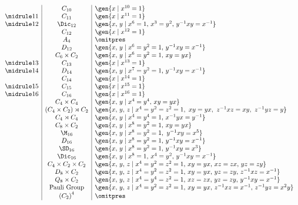 \begin{table}
\begin{center}
\begin{displaymath}
\begin{array}{c|c|l}
       & C_{10} & \gen{x \mid x^{10} = 1} \\
    \midrule
    11 & C_{11} & \gen{x \mid x^{11} = 1} \\
    \midrule
    12 & \Dic_{12} & \gen{x,\,y \mid x^6 = 1,\, x^3 = y^2,\, y^{-1}xy = x^{-1}} \\
       & C_{12} & \gen{x \mid x^{12} = 1} \\
       & A_4 & {\omitpres} \\ %
       & D_{12} & \gen{x,\,y \mid x^6 = y^2 = 1,\, y^{-1}xy = x^{-1}} \\
       & C_6 \times C_2 & \gen{x,\,y \mid x^6 = y^2 = 1,\, xy = yx} \\
    \midrule
    13 & C_{13} & \gen{x \mid x^{13} = 1} \\
    \midrule
    14 & D_{14} & \gen{x,\,y \mid x^7 = y^2 = 1,\, y^{-1}xy = x^{-1}} \\
       & C_{14} & \gen{x \mid x^{14} = 1} \\
    \midrule
    15 & C_{15} & \gen{x \mid x^{15} = 1} \\
    \midrule
    16 & C_{16} & \gen{x \mid x^{16} = 1} \\
       & C_4 \times C_4 & \gen{x,\,y \mid x^4 = y^4,\, xy = yx} \\
       & (C_4 \times C_2) \rtimes C_2 & \gen{x,\,y,\,z \mid x^4 = y^2 = z^2 = 1,\ xy = yx,\ z^{-1}xz = xy,\ z^{-1}yz = y} \\
       & C_4 \rtimes C_4 & \gen{x,\,y \mid x^4 = y^4 = 1,\, x^{-1}yx = y^{-1}} \\
       & C_8 \times C_2 & \gen{x,\,y \mid x^8 = y^2 = 1,\, xy = yx} \\
       & \M_{16} & \gen{x,\,y \mid x^8 = y^2 = 1,\ y^{-1}xy = x^{5}} \\
       & D_{16} & \gen{x,\,y \mid x^8 = y^2 = 1,\, y^{-1}xy = x^{-1}} \\
       & \SD_{16} & \gen{x,\,y \mid x^8 = y^2 = 1,\, y^{-1}xy = x^3} \\
       & \Dic_{16} & \gen{x,\,y \mid x^8 = 1,\, x^4 = y^2,\, y^{-1}xy = x^{-1}} \\
       & C_4 \times C_2 \times C_2 & \gen{x,\,y,\,z \mid x^4 = y^2 = z^2 = 1,\, xy = yx,\, xz = zx,\, yz = zy} \\
       & D_8 \times C_2 & \gen{x,\,y,\,z \mid x^4 = y^2 = z^2 = 1,\, xy = yx,\, yz = zy,\, z^{-1}xz = x^{-1}} \\
       & Q_8 \times C_2 & \gen{x,\,y,\,z \mid x^4 = y^4 = z^2 = 1,\, xz = zx,\, yz = zy,\, y^{-1}xy = x^{-1}} \\
       & \text{Pauli Group} & \gen{x,\,y,\,z \mid x^4 = y^2 = z^2 = 1,\, xy = yx,\, z^{-1}xz = x^{-1},\, z^{-1}yz = x^2 y}\\
       & {(C_2)}^4 & {\omitpres} \\


\end{array}
\end{displaymath}
\end{center}
\end{table}
